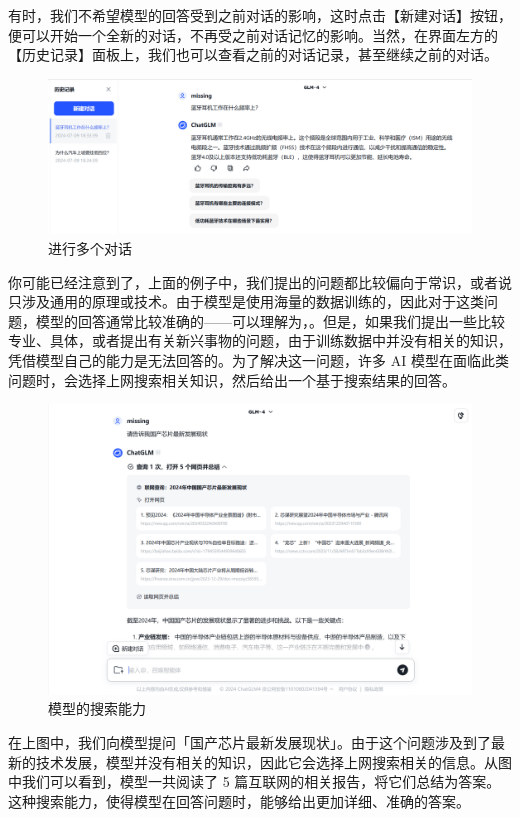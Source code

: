有时，我们不希望模型的回答受到之前对话的影响，这时点击【新建对话】按钮，便可以开始一个全新的对话，不再受之前对话记忆的影响。当然，在界面左方的【历史记录】面板上，我们也可以查看之前的对话记录，甚至继续之前的对话。

\begin{figure}[htb!]
  \centering
  \includegraphics[width=.9\textwidth]{assets/surpass/Zhipu_q3.png}
  \caption{进行多个对话}
  \label{fig:Zhipu_q3}
\end{figure}

你可能已经注意到了，上面的例子中，我们提出的问题都比较偏向于常识，或者说只涉及通用的原理或技术。由于模型是使用海量的数据训练的，因此对于这类问题，模型的回答通常比较准确的——可以理解为，。但是，如果我们提出一些比较专业、具体，或者提出有关新兴事物的问题，由于训练数据中并没有相关的知识，凭借模型自己的能力是无法回答的。为了解决这一问题，许多 AI 模型在面临此类问题时，会选择上网搜索相关知识，然后给出一个基于搜索结果的回答。

\begin{figure}[htb!]
  \centering
  \includegraphics[width=.8\textwidth]{assets/surpass/Zhipu_q4.png}
  \caption{模型的搜索能力}
  \label{fig:Zhipu_q4}
\end{figure}

在上图中，我们向模型提问「国产芯片最新发展现状」。由于这个问题涉及到了最新的技术发展，模型并没有相关的知识，因此它会选择上网搜索相关的信息。从图中我们可以看到，模型一共阅读了 5 篇互联网的相关报告，将它们总结为答案。这种搜索能力，使得模型在回答问题时，能够给出更加详细、准确的答案。

